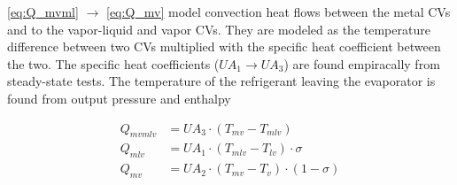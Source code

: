 \medskip
\cref{eq:Q_mvml} $\rightarrow$ \cref{eq:Q_mv} model convection heat flows between the metal CVs and to the vapor-liquid and vapor CVs. They are modeled as the temperature difference between two CVs multiplied with the specific heat coefficient between the two. The specific heat coefficients ($U A_1 \rightarrow U A_3$) are found empiracally from steady-state tests. The temperature of the refrigerant leaving the evaporator is found from output pressure and enthalpy

\begin{align}
	Q_{mvmlv} 		& = U A_3 \cdot (T_{mv} - T_{mlv}) 								\label{eq:Q_mvml} 			\\
	Q_{mlv} 			& = U A_1 \cdot (T_{mlv} - T_{lv}) \cdot \sigma						\label{eq:Q_ml} 			\\
	Q_{mv} 			& = U A_2 \cdot (T_{mv} - T_v) \cdot (1- \sigma)                \label{eq:Q_mv}
\end{align}

